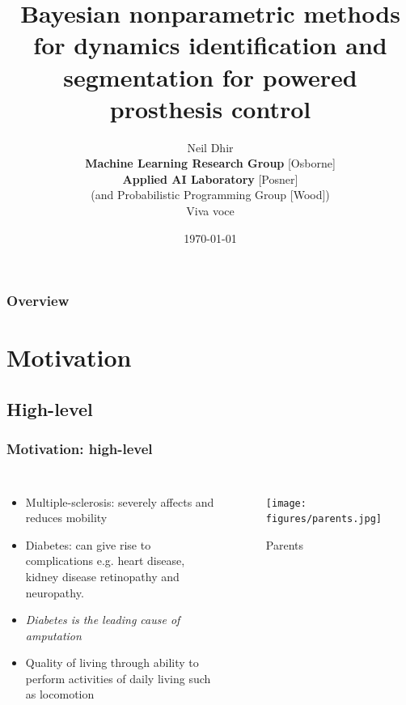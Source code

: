 \documentclass[aspectratio=169]{beamer}
\title[Nonparametrics]{Bayesian nonparametric methods for dynamics identification and segmentation for powered
prosthesis control}
\author
{\texorpdfstring{
        Neil Dhir  \\
        \footnotesize 
        {\bf Machine Learning Research Group} [Osborne] \\
        {\bf Applied AI Laboratory} [Posner] \\
        (and Probabilistic Programming Group [Wood])
        \vspace{1cm}\\
        {Viva voce}
    }%
    {} 
\date{\today}} %
\begin{document}
\begin{frame}
    \titlepage %
\end{frame}

\begin{frame}
    \frametitle{Overview} %
    \tableofcontents %
\end{frame}


\section{Motivation}

\begin{frame}[plain]
    \subsection{High-level}
    \frametitle{Motivation: high-level}
    \begin{columns}[t] %

        \begin{itemize}
            \item Multiple-sclerosis: severely affects and reduces mobility 
            \item Diabetes: can give rise to complications e.g. heart disease, kidney disease
                retinopathy and neuropathy. 
            \item {\it Diabetes is the leading cause of amputation} 
            \item Quality of living through ability to perform activities of daily living such as locomotion
        \end{itemize}
        \begin{figure}[ht]
            \texttt{[image: figures/parents.jpg]}
            \caption{Parents}
        \end{figure}
    \end{columns}
\end{frame}
\end{document}
